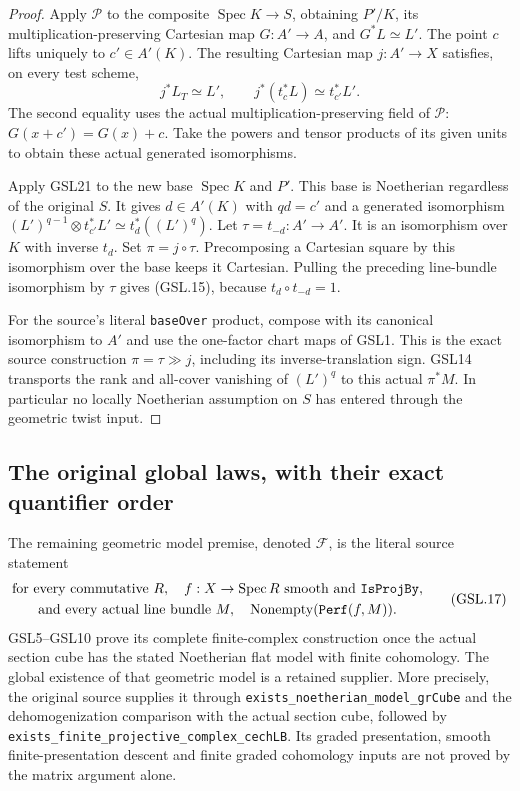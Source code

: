 \documentclass[11pt,a4paper]{article}
\numberwithin{equation}{section}
\theoremstyle{remark}\newtheorem{remark}[theorem]{Remark}
\begin{document}
\begin{proof}
Apply $\mathcal P$ to the composite $\operatorname{Spec}K\to S$,
obtaining $P'/K$, its multiplication-preserving Cartesian
map $G:A'\to A$, and $G^*L\simeq L'$.  The point $c$ lifts
uniquely to $c'\in A'(K)$.  The resulting Cartesian map
$j:A'\to X$ satisfies, on every test scheme,
\[
 j^*L_T\simeq L',\qquad
 j^*(t_c^*L)\simeq t_{c'}^*L'.
 \tag{GSL.16}
\]
The second equality uses the actual multiplication-preserving
field of $\mathcal P$: $G(x+c')=G(x)+c$.
Take the powers and tensor products of its given units to
obtain these actual generated isomorphisms.

Apply GSL21 to the new base $\operatorname{Spec}K$ and $P'$.
This base is Noetherian regardless of the original $S$.
It gives $d\in A'(K)$ with $qd=c'$ and a generated
isomorphism
$(L')^{q-1}\otimes t_{c'}^*L'\simeq t_d^*((L')^q)$.
Let $\tau=t_{-d}:A'\to A'$.  It is an isomorphism over $K$
with inverse $t_d$.  Set $\pi=j\circ\tau$.
Precomposing a Cartesian square by this isomorphism over the
base keeps it Cartesian.  Pulling the preceding line-bundle
isomorphism by $\tau$ gives (GSL.15), because
$t_d\circ t_{-d}=1$.

For the source's literal \texttt{base\allowbreak Over} product, compose
with its canonical isomorphism to $A'$ and use the one-factor
chart maps of GSL1.  This is the exact source construction
$\pi=\tau\gg j$, including its inverse-translation sign.
GSL14 transports the rank and all-cover vanishing of $(L')^q$
to this actual $\pi^*M$.  In particular no locally Noetherian
assumption on $S$ has entered through the geometric twist input.
\end{proof}

\subsection{The original global laws, with their exact quantifier order}

The remaining geometric model premise, denoted $\mathcal F$, is the
literal source statement
\[
 \begin{gathered}
 \text{for every commutative }R,\quad
 f:X\to\operatorname{Spec}R\text{ smooth and }\texttt{Is\allowbreak Proj\allowbreak By},\\
 \text{and every actual line bundle }M,\quad
        \operatorname{Nonempty}(\texttt{Perf}(f,M)).
 \end{gathered} \tag{GSL.17}
\]
GSL5--GSL10 prove its complete finite-complex construction once the
actual section cube has the stated Noetherian flat model with finite
cohomology.  The global existence of that geometric model is a retained
supplier.  More precisely, the original source supplies it through
\texttt{exists\_\allowbreak noetherian\_\allowbreak model\_\allowbreak gr\allowbreak Cube} and the dehomogenization
comparison with the actual section cube, followed by
\texttt{exists\_\allowbreak finite\_\allowbreak projective\_\allowbreak complex\_\allowbreak cech\allowbreak LB}.  Its graded
presentation, smooth finite-presentation descent and finite graded
cohomology inputs are not proved by the matrix argument alone.
\end{document}
